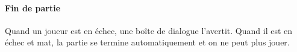 \paragraph{Fin de partie} Quand un joueur est en échec, une boîte de dialogue l'avertit. Quand il est en échec et mat, la partie se termine automatiquement et on ne peut plus jouer. 
